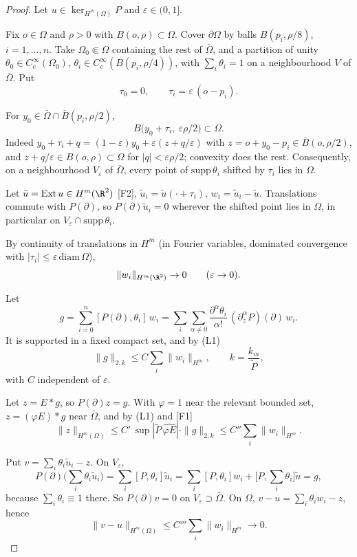 \begin{proof}
Let $u\in\ker_{H^m(\Omega)}P$ and $\varepsilon\in(0,1]$.

Fix $o\in\Omega$ and $\rho>0$ with $B(o,\rho)\subset\Omega$. Cover $\partial\Omega$ by balls $B(p_i,\rho/8)$, $i=1,\dots,n$. Take $\Omega_0\Subset\Omega$ containing the rest of $\bar\Omega$, and a partition of unity $\theta_0\in C_c^\infty(\Omega_0)$, $\theta_i\in C_c^\infty(B(p_i,\rho/4))$, with $\sum_i\theta_i=1$ on a neighbourhood $V$ of $\bar\Omega$. Put
\[
\tau_0=0,\qquad \tau_i=\varepsilon\,(o-p_i).
\]

For $y_0\in\bar\Omega\cap\bar B(p_i,\rho/2)$,
\[
B\big(y_0+\tau_i,\ \varepsilon\rho/2\big)\subset\Omega .
\]
Indeed $y_0+\tau_i+q=(1-\varepsilon)y_0+\varepsilon(z+q/\varepsilon)$ with $z=o+y_0-p_i\in\bar B(o,\rho/2)$, and $z+q/\varepsilon\in B(o,\rho)\subset\Omega$ for $|q|<\varepsilon\rho/2$; convexity does the rest. Consequently, on a neighbourhood $V_\varepsilon$ of $\bar\Omega$, every point of $\mathrm{supp}\,\theta_i$ shifted by $\tau_i$ lies in $\Omega$.

Let $\tilde u=\mathrm{Ext}\,u\in H^m(\R^2)$ [F2], $\tilde u_i=\tilde u(\cdot+\tau_i)$, $w_i=\tilde u_i-\tilde u$. Translations commute with $P(\partial)$, so $P(\partial)\tilde u_i=0$ wherever the shifted point lies in $\Omega$, in particular on $V_\varepsilon\cap\mathrm{supp}\,\theta_i$.

By continuity of translations in $H^m$ (in Fourier variables, dominated convergence with $|\tau_i|\le\varepsilon\,\mathrm{diam}\,\Omega$),
\[
\|w_i\|_{H^m(\R^2)}\to0\qquad(\varepsilon\to0).
\]

Let
\[
g=\sum_{i=0}^n[P(\partial),\theta_i]\,w_i=\sum_i\sum_{\alpha\ne0}\frac{\partial^\alpha\theta_i}{\alpha!}\,(\partial_z^\alpha P)(\partial)\,w_i .
\]
It is supported in a fixed compact set, and by (L1)
\[
\|g\|_{2,k}\le C\sum_i\|w_i\|_{H^m},\qquad k=\frac{k_m}{\tilde P},
\]
with $C$ independent of $\varepsilon$.

Let $z=E*g$, so $P(\partial)z=g$. With $\varphi=1$ near the relevant bounded set, $z=(\varphi E)*g$ near $\bar\Omega$, and by (L1) and [F1]
\[
\|z\|_{H^m(\Omega)}\le C'\,\sup|\tilde P\,\widehat{\varphi E}|\cdot\|g\|_{2,k}\le C''\sum_i\|w_i\|_{H^m}.
\]

Put $v=\sum_i\theta_i\tilde u_i-z$. On $V_\varepsilon$,
\[
P(\partial)\Big(\sum_i\theta_i\tilde u_i\Big)=\sum_i[P,\theta_i]\tilde u_i=\sum_i[P,\theta_i]w_i+\Big[P,\sum_i\theta_i\Big]\tilde u=g,
\]
because $\sum_i\theta_i\equiv1$ there. So $P(\partial)v=0$ on $V_\varepsilon\supset\bar\Omega$. On $\Omega$, $v-u=\sum_i\theta_iw_i-z$, hence
\[
\|v-u\|_{H^m(\Omega)}\le C'''\sum_i\|w_i\|_{H^m}\to0 .
\]


\end{proof}
